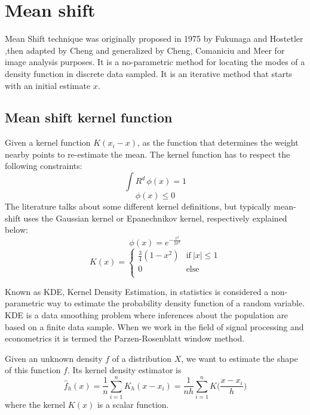 \chapter{Mean shift}
Mean Shift technique was originally proposed in 1975 by Fukunaga and Hostetler \cite{fuku},then adapted by Cheng \cite{cheng} and generalized by Cheng, Comaniciu and Meer \cite{comaniciu} for image analysis purposes. It is a no-parametric method for locating the modes of a density function in  discrete data sampled. It is an iterative method that starts with an initial estimate $x$.
\section{Mean shift kernel function}
Given a kernel function $K(x_{i}-x)$, as the function that determines the weight nearby points to re-estimate the mean. The kernel function has to respect the following constraints:
\begin{equation}
\int R^{d} \,\phi({x})=1 
\end{equation}
\begin{equation}
\phi ({x}) \leq 0
\end{equation}
The literature talks about some different kernel definitions, but typically mean-shift uses the Gaussian kernel or Epanechnikov kernel, respectively explained below:
\begin{equation}
\phi({x}) = e^{-\frac{x^{2}}{2\sigma^{2}}}
\end{equation}
\begin{equation}
K(x)={\begin{cases}\frac{3}{4}(1-x^{2})&{\text{if}}\ |x|\leq 1 \\0&{\text{else}}\  \\\end{cases}}
\end{equation}

\bigskip

Known as KDE, Kernel Density Estimation, in statistics is considered a non-parametric way to estimate the probability density function of a random variable. KDE is a data smoothing problem where inferences about the population are based on a finite data sample. When we work in the field of signal processing and econometrics it is termed the Parzen-Rosenblatt window method. 

\bigskip

Given an unknown density $f$ of a distribution $X$, we want to estimate the shape of this function $f$. Its kernel density estimator is 
\begin{equation}
{{\hat {f}}_{h}(x)={\frac {1}{n}}\sum _{i=1}^{n}K_{h}(x-x_{i})={\frac {1}{nh}}\sum _{i=1}^{n}K{\Big (}{\frac {x-x_{i}}{h}}{\Big )}}
\end{equation} 
where the kernel $K(x)$ is a scalar function.


